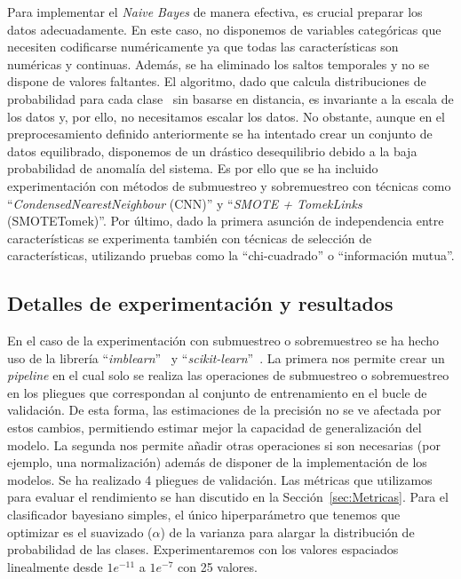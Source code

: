\documentclass[12pt,letterpaper]{article}
\begin{document}
Para implementar el \textit{Naive Bayes} de manera efectiva, es crucial preparar los datos adecuadamente. 
En este caso, no disponemos de variables categóricas que necesiten codificarse numéricamente ya que todas las características son numéricas y continuas. 
Además, se ha eliminado los saltos temporales y no se dispone de valores faltantes.
El algoritmo, dado que calcula distribuciones de probabilidad para cada clase~\cite{NaiveBayes} sin basarse en distancia, es invariante a la escala de los datos y, por ello, no necesitamos escalar los datos.
No obstante, aunque en el preprocesamiento definido anteriormente se ha intentado crear un conjunto de datos equilibrado, disponemos de un drástico desequilibrio debido a la baja probabilidad de anomalía del sistema.
Es por ello que se ha incluido experimentación con métodos de submuestreo y sobremuestreo con técnicas como ``\textit{CondensedNearestNeighbour} (CNN)'' y ``\textit{SMOTE + TomekLinks} (SMOTETomek)''.
Por último, dado la primera asunción de independencia entre características se experimenta también con técnicas de selección de características, utilizando pruebas como la ``chi-cuadrado'' o ``información mutua''.

\subsection{Detalles de experimentación y resultados}\label{sec:ExpBayes}
En el caso de la experimentación con submuestreo o sobremuestreo se ha hecho uso de la librería ``\textit{imblearn}''~\cite{imblearn} y ``\textit{scikit-learn}''~\cite{sklearn}. 
La primera nos permite crear un \textit{pipeline} en el cual solo se realiza las operaciones de submuestreo o sobremuestreo en los pliegues que correspondan al conjunto de entrenamiento en el bucle de validación. 
De esta forma, las estimaciones de la precisión no se ve afectada por estos cambios, permitiendo estimar mejor la capacidad de generalización del modelo. La segunda nos permite añadir otras operaciones si son necesarias (por ejemplo, una normalización) además de disponer de la implementación de los modelos.
Se ha realizado 4 pliegues de validación. Las métricas que utilizamos para evaluar el rendimiento se han discutido en la Sección~\ref{sec:Metricas}.
Para el clasificador bayesiano simples, el único hiperparámetro que tenemos que optimizar es el suavizado ($\alpha$) de la varianza para alargar la distribución de probabilidad de las clases.
Experimentaremos con los valores espaciados linealmente desde $1e^{-11 }$ a $1e^{-7}$ con 25 valores.
\end{document}
